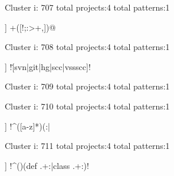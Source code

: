 Cluster i: 707
total projects:4
total patterns:1
\begin{multicols}{1}
\begin{description}[noitemsep,topsep=0pt]
\item [[4] ] \cverb@\s+([!{};:>+\(\)\],])@
\end{description}
\end{multicols}







Cluster i: 708
total projects:4
total patterns:1
\begin{multicols}{1}
\begin{description}[noitemsep,topsep=0pt]
\item [[4] ] \cverb!\.[svn|git|hg|scc|vssscc]!
\end{description}
\end{multicols}







Cluster i: 709
total projects:4
total patterns:1
\begin{multicols}{1}
\end{multicols}







Cluster i: 710
total projects:4
total patterns:1
\begin{multicols}{1}
\begin{description}[noitemsep,topsep=0pt]
\item [[4] ] \cverb!^([a-z]*)(:|%
\end{description}
\end{multicols}







Cluster i: 711
total projects:4
total patterns:1
\begin{multicols}{1}
\begin{description}[noitemsep,topsep=0pt]
\item [[4] ] \cverb!^(\s*)(def .+:|class .+:)!
\end{description}
\end{multicols}







